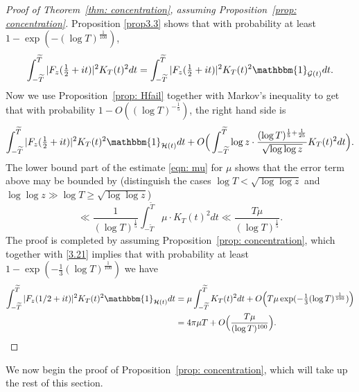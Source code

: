 \documentclass[12pt, notitlepage]{amsart}
\numberwithin{equation}{section}
\def\TT{\widetilde{T}}
\theoremstyle{remark}
\theoremstyle{definition}
\theoremstyle{remark}
\numberwithin{equation}{section}
\begin{document}
\begin{proof}[Proof of Theorem~\ref{thm: concentration}, assuming Proposition~\ref{prop: concentration}]
Proposition \ref{prop3.3} shows that with probability at least $ 1- \exp(-(\log T)^{\frac 1{100}})$, 
\[
\int_{-\TT}^{\TT} |F_z(\tfrac 12+it)|^{2}K_T(t)^{2} dt = \int_{-\TT}^{\TT} |F_z(\tfrac 12+it)|^{2}K_T(t)^{2} \mathbbm{1}_{\mathcal{G}(t)}dt.  
\]
Now we use Proposition~\ref{prop: Hfail} together with Markov's inequality to get that with probability $1- O((\log T)^{-\frac 15})$, the right hand side is 
\[
\int_{-\TT}^{\TT} |F_z(\tfrac 12+it)|^{2}K_T(t)^{2}\mathbbm{1}_{\mathcal{H}(t)} dt +  O\Big(\int_{-\TT}^{\TT}  \log z \cdot \frac{(\log T)^{\frac 15+\frac{1}{25}}}{\sqrt{\log \log z}}  K_T(t)^{2} dt\Big). 
\]
The lower bound part of the estimate \eqref{eqn: mu} for $\mu$ shows that the error term above may be bounded by (distinguish the cases $\log T <\sqrt{\log \log z}$ and $\log \log z \gg \log T \ge \sqrt{\log \log z}$) 
\[ 
\ll \frac{1}{(\log T)^{\frac 15}} \int_{-\TT}^{\TT} \mu \cdot  K_T(t)^{2}  dt \ll \frac{T \mu}{(\log T)^{\frac 15}}.
\]
The proof is completed by assuming  Proposition~\ref{prop: concentration}, which together with \eqref{3.21} implies that with probability at least $1 - \exp(- \frac 13(\log T)^{\frac 1{100}})$ we have
\begin{align*}
\int_{-\TT}^{\TT} |F_z(1/2+it)|^{2}K_T(t)^{2}\mathbbm{1}_{\mathcal{H}(t)} dt &= \mu \int_{-\TT}^{\TT} K_T(t)^2 dt  + O\Big( T \mu\exp(-\tfrac 13 (\log T)^{\frac 1{100}}) \Big) 
\\
&= 4\pi \mu T + O\Big( \frac{T\mu}{(\log T)^{100}}\Big).
\end{align*}
\end{proof}

We now begin the proof of Proposition~\ref{prop: concentration}, which will take up the rest of this section.  
\end{document}
